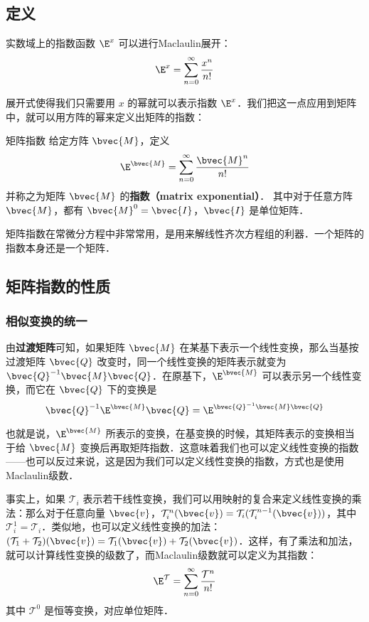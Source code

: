 

\subsection{定义}
实数域上的指数函数 $\E^x$ 可以进行Maclaulin展开：\begin{equation}
\E^x=\sum\limits_{n=0}^\infty \frac{x^n}{n!}
\end{equation}

展开式使得我们只需要用 $x$ 的幂就可以表示指数 $\E^x$．我们把这一点应用到矩阵中，就可以用方阵的幂来定义出矩阵的指数：

\begin{definition}{矩阵指数}
给定方阵 $\bvec{M}$，定义
\begin{equation}\label{MatExp_eq2}
\E^{\bvec{M}}=\sum_{n=0}^\infty \frac{\bvec{M}^n}{n!}
\end{equation}
并称之为矩阵 $\bvec{M}$ 的\textbf{指数（matrix exponential）}． 其中对于任意方阵 $\bvec{M}$，都有 $\bvec{M}^0=\bvec{I}$，$\bvec{I}$ 是单位矩阵．
\end{definition}

矩阵指数在常微分方程中非常常用，是用来解线性齐次方程组的利器．一个矩阵的指数本身还是一个矩阵．

\subsection{矩阵指数的性质}

\subsubsection{相似变换的统一}

由\textbf{过渡矩阵}可知，如果矩阵 $\bvec{M}$ 在某基下表示一个线性变换，那么当基按过渡矩阵 $\bvec{Q}$ 改变时，同一个线性变换的矩阵表示就变为 $\bvec{Q}^{-1}\bvec{M}\bvec{Q}$．在原基下，$\E^{\bvec{M}}$ 可以表示另一个线性变换，而它在 $\bvec{Q}$ 下的变换是
\begin{equation}\label{MatExp_eq1}
\bvec{Q}^{-1}\E^{\bvec{M}}\bvec{Q}=\E^{\bvec{Q}^{-1}\bvec{M}\bvec{Q}}
\end{equation}

也就是说，$\E^{\bvec{M}}$ 所表示的变换，在基变换的时候，其矩阵表示的变换相当于给 $\bvec{M}$ 变换后再取矩阵指数．这意味着我们也可以定义线性变换的指数——也可以反过来说，这是因为我们可以定义线性变换的指数，方式也是使用Maclaulin级数．

事实上，如果 $\mathcal{T}_i$ 表示若干线性变换，我们可以用映射的复合来定义线性变换的乘法：那么对于任意向量 $\bvec{v}$，$\mathcal{T}^n_i(\bvec{v})=\mathcal{T}_i(\mathcal{T}^{n-1}_i(\bvec{v}))$，其中 $\mathcal{T}_i^1=\mathcal{T}_i$．类似地，也可以定义线性变换的加法：$(\mathcal{T}_1+\mathcal{T}_2)(\bvec{v})=\mathcal{T}_1(\bvec{v})+\mathcal{T}_2(\bvec{v})$．这样，有了乘法和加法，就可以计算线性变换的级数了，而Maclaulin级数就可以定义为其指数：
\begin{equation}
\E^\mathcal{T}=\sum\limits_{n=0}^\infty \frac{\mathcal{T}^n}{n!}
\end{equation}
其中 $\mathcal{T}^0$ 是恒等变换，对应单位矩阵．

